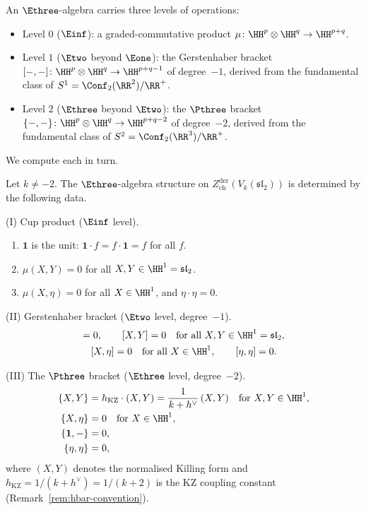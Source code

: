 An $\Ethree$-algebra carries three levels of
operations:
\begin{itemize}
\item Level $0$ ($\Einf$): a graded-commutative product
  $\mu\colon \HH^p \otimes \HH^q \to \HH^{p+q}$.
\item Level $1$ ($\Etwo$ beyond $\Eone$): the
  Gerstenhaber bracket
  $[-,-]\colon \HH^p \otimes \HH^q \to \HH^{p+q-1}$
  of degree~$-1$, derived from the fundamental class of
  $S^1 = \Conf_2(\RR^2)/\RR^+$.
\item Level $2$ ($\Ethree$ beyond $\Etwo$): the $\Pthree$
  bracket
  $\{-,-\}\colon \HH^p \otimes \HH^q \to \HH^{p+q-2}$
  of degree~$-2$, derived from the fundamental class of
  $S^2 = \Conf_2(\RR^3)/\RR^+$.
\end{itemize}
We compute each in turn.

\begin{proposition}
\label{prop:e3-explicit-sl2}
Let $k \neq -2$.
The $\Ethree$-algebra structure on
$Z^{\mathrm{der}}_{\mathrm{ch}}(V_k(\mathfrak{sl}_2))$
is determined by the following data.

\smallskip
\noindent
\textup{(I) Cup product} ($\Einf$ level).
\begin{enumerate}[label=\textup{(\alph*)}]
\item $\mathbf{1}$ is the unit:
  $\mathbf{1} \cdot f = f \cdot \mathbf{1} = f$ for all $f$.
\item
  $\mu(X, Y) = 0$ for all $X, Y \in \HH^1 = \mathfrak{sl}_2$.
\item
  $\mu(X, \eta) = 0$ for all $X \in \HH^1$, and
  $\eta \cdot \eta = 0$.
\end{enumerate}

\smallskip
\noindent
\textup{(II) Gerstenhaber bracket} ($\Etwo$ level,
degree~$-1$).
\begin{gather*}
  [\mathbf{1}, -] = 0, \qquad
  [X, Y] = 0 \quad \text{for all }
  X, Y \in \HH^1 = \mathfrak{sl}_2, \\
  [X, \eta] = 0 \quad \text{for all } X \in \HH^1,
  \qquad [\eta, \eta] = 0.
\end{gather*}

\smallskip
\noindent
\textup{(III) The $\Pthree$ bracket} ($\Ethree$ level,
degree~$-2$).
\begin{align}
  \label{eq:e3-p3-killing}
  \{X, Y\}
  &= h_{\mathrm{KZ}} \cdot (X, Y)
  = \frac{1}{k + h^\vee}\,(X, Y)
  \quad \text{for } X, Y \in \HH^1,
  \\
  \label{eq:e3-p3-derivation}
  \{X, \eta\}
  &= 0
  \quad \text{for } X \in \HH^1,
  \\
  \label{eq:e3-p3-unit}
  \{\mathbf{1}, -\}
  &= 0,
  \\
  \label{eq:e3-p3-top}
  \{\eta, \eta\}
  &= 0,
\end{align}
where $(X, Y)$ denotes the normalised Killing form
and $h_{\mathrm{KZ}} = 1/(k + h^\vee) = 1/(k + 2)$ is
the KZ coupling constant
\textup{(}Remark~\textup{\ref{rem:hbar-convention}}\textup{)}.
\end{proposition}

